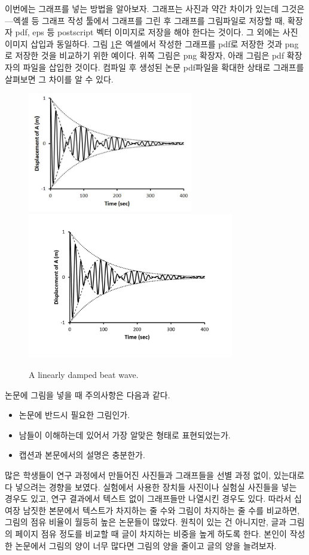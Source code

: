 \documentclass[twoside,11pt]{gshs_thesis}
\begin{document}
이번에는 그래프를 넣는 방법을 알아보자. 그래프는 사진과 약간 차이가 있는데 그것은---엑셀 등 그래프 작성 툴에서 그래프를 그린 후 그래프를 그림파일로 저장할 때, 확장자 pdf, eps 등 postscript 벡터 이미지로 저장을 해야 한다는 것이다. 그 외에는 사진 이미지 삽입과 동일하다. 그림 \ref{Fig01}은 엑셀에서 작성한 그래프를 pdf로 저장한 것과 png로 저장한 것을 비교하기 위한 예이다. 위쪽 그림은 png 확장자, 아래 그림은 pdf 확장자의 파일을 삽입한 것이다. 컴파일 후 생성된 논문 pdf파일을 확대한 상태로 그래프를 살펴보면 그 차이를 알 수 있다.


\begin{figure}[t]
\begin{center}
\includegraphics[width=7.2cm]{Figure01.png}\\
\includegraphics[width=9cm]{Figure01.pdf}
\caption{A linearly damped beat wave.} \label{Fig01}
\end{center}
\end{figure}

논문에 그림을 넣을 때 주의사항은 다음과 같다.
\begin{itemize}
\item{논문에 반드시 필요한 그림인가.}
\item{남들이 이해하는데 있어서 가장 알맞은 형태로 표현되었는가.}
\item{캡션과 본문에서의 설명은 충분한가.}
\end{itemize}
많은 학생들이 연구 과정에서 만들어진 사진들과 그래프들을 선별 과정 없이, 있는대로 다 넣으려는 경향을 보였다. 실험에서 사용한 장치들 사진이나 실험실 사진들을 넣는 경우도 있고, 연구 결과에서 텍스트 없이 그래프들만 나열시킨 경우도 있다. 따라서 십여장 남짓한 본문에서 텍스트가 차지하는 줄 수와 그림이 차지하는 줄 수를 비교하면, 그림의 점유 비율이 월등히 높은 논문들이 많았다. 원칙이 있는 건 아니지만, 글과 그림의 페이지 점유 정도를 비교할 때 글이 차지하는 비중을 높게 하도록 한다. 본인이 작성한 논문에서 그림의 양이 너무 많다면 그림의 양을 줄이고 글의 양을 늘려보자.
\end{document}
